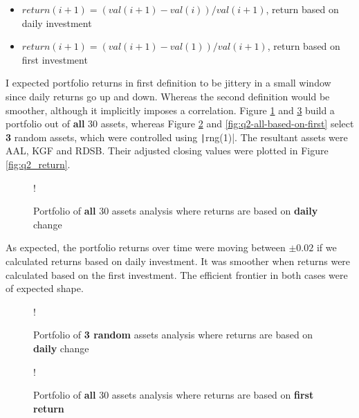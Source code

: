 \documentclass[11pt]{article}
\begin{document}
\begin{itemize}
	\item $return(i+1) = (val(i+1) - \mathit{val(i)})/val(i+1)$, return based on daily investment
	\item $return(i+1) = (val(i+1) - \mathit{val(1)})/val(i+1)$, return based on first investment
\end{itemize}

I expected portfolio returns in first definition to be jittery in a small window since daily returns
go up and down. Whereas the second definition would be smoother, although it implicitly imposes a correlation. 
Figure \ref{fig:q2-all-assets-all-based-on-daily} and \ref{fig:q2-all-assets-all-based-on-first} build a portfolio out of \textbf{all} 30 assets, whereas
Figure \ref{fig:q2-all-based-on-daily} and \ref{fig:q2-all-based-on-first} select \textbf{3} random assets,
which were controlled using \texttt|rng(1)|. The resultant assets were AAL, KGF and RDSB.
Their adjusted closing values were plotted in Figure \ref{fig:q2_return}.

\begin{figure}[!h]
   \centering 
 	\resizebox {\textwidth} {!} { }
    \caption{Portfolio of \textbf{all} 30 assets analysis where returns are based on \textbf{daily} change}
	\label{fig:q2-all-assets-all-based-on-daily}
	\vspace{-0.3cm}
\end{figure}

As expected, the portfolio returns over time were moving between $\pm0.02$ if we calculated returns
based on daily investment. It was smoother when returns were calculated based on the first investment. The efficient frontier in
both cases were of expected shape.

\begin{figure}[!h]
   \centering 
 	\resizebox {\textwidth} {!} { }
    \caption{Portfolio of \textbf{3 random} assets analysis where returns are based on \textbf{daily} change}
	\label{fig:q2-all-based-on-daily}
	\vspace{-0.3cm}
\end{figure}

\begin{figure}[!h]
   \centering 
 	\resizebox {\textwidth} {!} { }
    \caption{Portfolio of \textbf{all} 30 assets analysis where returns are based on \textbf{first return}}
	\label{fig:q2-all-assets-all-based-on-first}
	\vspace{-0.3cm}
\end{figure}
\end{document}
